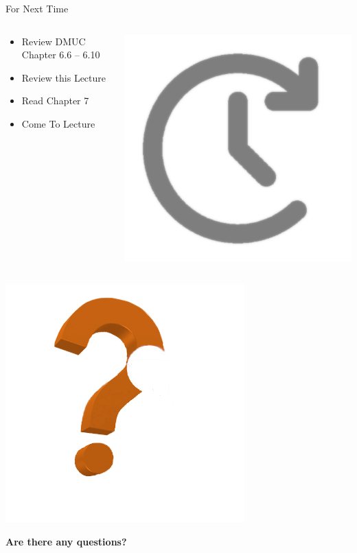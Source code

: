 \documentclass[11pt,t,pdf,xcolor=svgnames,aspectratio=169]{beamer}
\providecommand{\tightlist}{%
  \setlength{\itemsep}{5pt}\setlength{\parskip}{0pt}}
\begin{document}
\begin{frame}{For Next Time}
\protect\hypertarget{for-next-time}{}
\begin{columns}[T]
\begin{column}{0.48\textwidth}
\begin{itemize}
\tightlist
\item
  Review DMUC Chapter 6.6 -- 6.10
\item
  Review this Lecture
\item
  Read Chapter 7
\item
  Come To Lecture
\end{itemize}
\end{column}

\begin{column}{0.48\textwidth}
\centering

\includegraphics[width=.85\textwidth]{images/next_time-invert2.png}
\end{column}
\end{columns}
\end{frame}

\begin{frame}{}
\protect\hypertarget{section-5}{}
\vfill
\centering

\includegraphics[scale=.40]{images/questions-invert2.png}

\Huge \textbf{Are there any questions?}
\end{frame}
\end{document}
